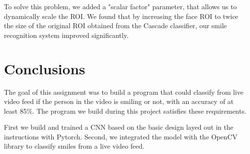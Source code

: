 \documentclass[12pt,a4paper,english
]{tunithesis}
\begin{document}
To solve this problem, we added a "scalar factor" parameter, that allows us to dynamically scale the ROI. We found that by increasing the face ROI to twice the size of the original ROI obtained from the Cascade classifier, our smile recognition system improved significantly.

\chapter{Conclusions}
\label{ch:conclusions}
The goal of this assignment was to build a program that could classify from live video feed if the person in the video is smiling or not, with an accuracy of at least 85\%. The program we build during this project satisfies these requirements.

First we build and trained a CNN based on the basic design layed out in the instructions with Pytorch.
Second, we integrated the model with the OpenCV library to classify smiles from a live video feed.

%
%
\newpage

\printbibliography[title=References]
\end{document}
